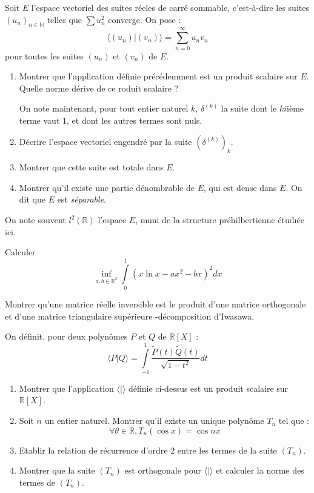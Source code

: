 
\begin{exer}
Soit $E$ l'espace vectoriel des suites r\'eeles de carr\'e sommable, c'est-\`a-dire les suites $(u_n)_{n\in\mathbb{N}}$ telles que $\sum u_n^2$ converge. %
On pose : \[\langle(u_n)|(v_n)\rangle =\sum\limits_{n=0}^{\infty} u_n v_n\]
pour toutes les suites $(u_n)$ et $(v_n)$ de $E$.
\begin{enumerate}
\item Montrer que l'application d\'efinie pr\'ec\'edemment est un produit scalaire sur $E$. Quelle norme d\'erive de ce roduit scalaire ?

\smallskip
On note maintenant, pour tout entier naturel $k$, $\delta^{(k)}$ la suite dont le $ki$i\`eme terme vaut $1$, et dont les autres termes sont nuls.
\item D\'ecrire l'espace vectoriel engendr\'e par la suite $(\delta^{(k)})_k$.
\item Montrer que cette suite est totale dans $E$.
\item Montrer qu'il existe une partie d\'enombrable de $E$, qui est dense dans $E$. On dit que $E$ est \textit{s\'eparable}.
\end{enumerate}
On note souvent $l^2(\mathbb{R})$ l'espace $E$, muni de la structure pr\'ehilbertienne \'etud\i\'ee ici.
\end{exer}

\begin{exer}
Calculer \[\underset{a,b\in\mathbb{R}^2}{\inf}\int\limits_0^1(x\ln x -ax^2-bx)^2 dx\]
\end{exer}

\begin{exer}
Montrer qu'une matrice réelle inversible est le produit d'une matrice orthogonale et d'une matrice triangulaire supérieure %
-décomposition d'Iwasawa.
\end{exer}

\begin{exer}
On d\'efinit, pour deux polyn\^omes $P$ et $Q$ de $\mathbb{R}[X]$ :
\[\langle P|Q \rangle =\int\limits_{-1}^1 \frac{\tilde{P}(t)\tilde{Q}(t)}{\sqrt{1-t^2}}dt\]
\begin{enumerate}
\item Montrer que l'application $\langle |\rangle$ d\'efinie ci-dessus est un produit scalaire sur $\mathbb{R}[X]$.
\item Soit $n$ un entier naturel. Montrer qu'il existe un unique polyn\^ome $T_n$ tel que :
\[\forall\theta\in\mathbb{R} , T_n(\cos x)=\cos nx\]
\item Etablir la relation de r\'ecurrence d'ordre $2$ entre les termes de la suite $(T_n)$.
\item Montrer que la suite $(T_n)$ est orthogonale pour $\langle |\rangle$ et calculer la norme des termes de $(T_n)$.
\end{enumerate}
\end{exer}

